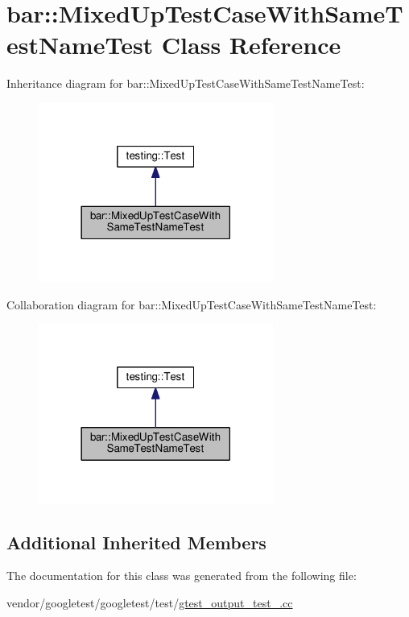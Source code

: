 \hypertarget{classbar_1_1MixedUpTestCaseWithSameTestNameTest}{}\section{bar\+:\+:Mixed\+Up\+Test\+Case\+With\+Same\+Test\+Name\+Test Class Reference}
\label{classbar_1_1MixedUpTestCaseWithSameTestNameTest}


Inheritance diagram for bar\+:\+:Mixed\+Up\+Test\+Case\+With\+Same\+Test\+Name\+Test\+:
\nopagebreak
\begin{figure}[H]
\begin{center}
\leavevmode
\includegraphics[width=218pt]{classbar_1_1MixedUpTestCaseWithSameTestNameTest__inherit__graph}
\end{center}
\end{figure}


Collaboration diagram for bar\+:\+:Mixed\+Up\+Test\+Case\+With\+Same\+Test\+Name\+Test\+:
\nopagebreak
\begin{figure}[H]
\begin{center}
\leavevmode
\includegraphics[width=218pt]{classbar_1_1MixedUpTestCaseWithSameTestNameTest__coll__graph}
\end{center}
\end{figure}
\subsection*{Additional Inherited Members}


The documentation for this class was generated from the following file\+:\begin{DoxyCompactItemize}
\item 
vendor/googletest/googletest/test/\hyperlink{gtest__output__test___8cc}{gtest\+\_\+output\+\_\+test\+\_\+.\+cc}\end{DoxyCompactItemize}
